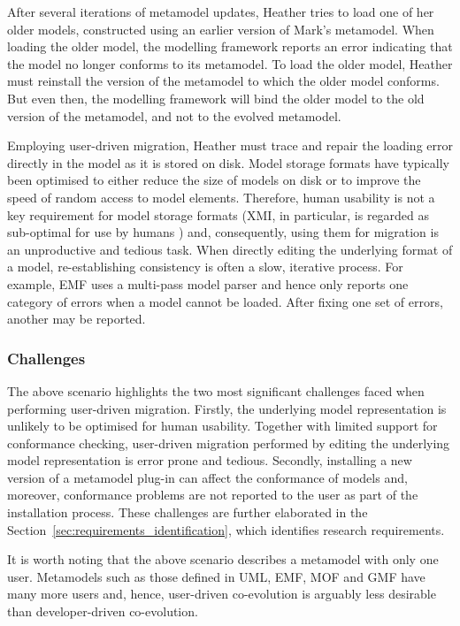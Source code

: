 After several iterations of metamodel updates, Heather tries to load one of her older models, constructed using an earlier version of Mark's metamodel. When loading the older model, the modelling framework reports an error indicating that the model no longer conforms to its metamodel. To load the older model, Heather must reinstall the version of the metamodel to which the older model conforms. But even then, the modelling framework will bind the older model to the old version of the metamodel, and not to the evolved metamodel.

Employing user-driven migration, Heather must trace and repair the loading error directly in the model as it is stored on disk. Model storage formats have typically been optimised to either reduce the size of models on disk or to improve the speed of random access to model elements. Therefore, human usability is not a key requirement for model storage formats (XMI, in particular, is regarded as sub-optimal for use by humans \cite{hutn}) and, consequently, using them for migration is an unproductive and tedious task. When directly editing the underlying format of a model, re-establishing consistency is often a slow, iterative process. For example, EMF uses a multi-pass model parser and hence only reports one category of errors when a model cannot be loaded. After fixing one set of errors, another may be reported.


\subsubsection{Challenges}
The above scenario highlights the two most significant challenges faced when performing user-driven migration. Firstly, the underlying model representation is unlikely to be optimised for human usability. Together with limited support for conformance checking, user-driven migration performed by editing the underlying model representation is error prone and tedious. Secondly, installing a new version of a metamodel plug-in can affect the conformance of models and, moreover, conformance problems are not reported to the user as part of the installation process. These challenges are further elaborated in the Section~\ref{sec:requirements_identification}, which identifies research requirements.

It is worth noting that the above scenario describes a metamodel with only one user. Metamodels such as those defined in UML, EMF, MOF and GMF have many more users and, hence, user-driven co-evolution is arguably less desirable than developer-driven co-evolution. 


